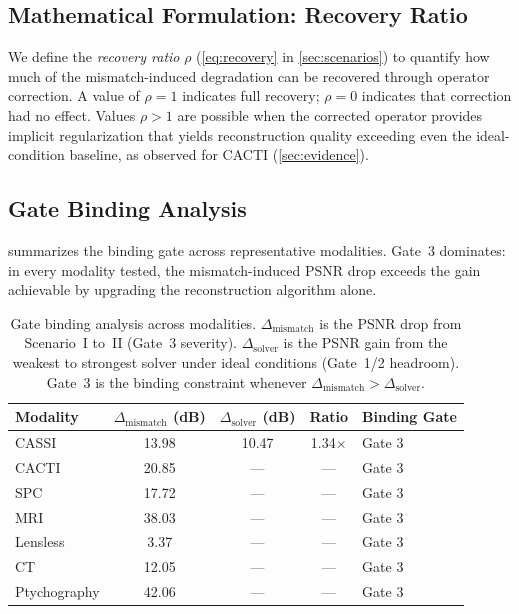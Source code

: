 \subsection{Mathematical Formulation: Recovery Ratio}

We define the \emph{recovery ratio} $\rho$ (\cref{eq:recovery} in \cref{sec:scenarios}) to quantify how much of the mismatch-induced degradation can be recovered through operator correction.  A value of $\rho = 1$ indicates full recovery; $\rho = 0$ indicates that correction had no effect.  Values $\rho > 1$ are possible when the corrected operator provides implicit regularization that yields reconstruction quality exceeding even the ideal-condition baseline, as observed for CACTI (\cref{sec:evidence}).

\subsection{Gate Binding Analysis}

 summarizes the binding gate across
representative modalities.  Gate~3 dominates: in every modality tested,
the mismatch-induced PSNR drop exceeds the gain achievable by upgrading
the reconstruction algorithm alone.

\begin{table}[t]
\centering
\caption{Gate binding analysis across modalities.
$\Delta_{\text{mismatch}}$ is the PSNR drop from Scenario~I to~II
(Gate~3 severity).
$\Delta_{\text{solver}}$ is the PSNR gain from the weakest to strongest
solver under ideal conditions (Gate~1/2 headroom).  Gate~3 is the
binding constraint whenever
$\Delta_{\text{mismatch}} > \Delta_{\text{solver}}$.}
\label{tab:gate_binding}
\smallskip
\begin{tabular}{@{}lcccl@{}}
\toprule
\textbf{Modality}  & $\Delta_{\text{mismatch}}$ (dB)
                    & $\Delta_{\text{solver}}$ (dB)
                    & \textbf{Ratio}
                    & \textbf{Binding Gate} \\
\midrule
CASSI               & 13.98 & 10.47 & 1.34$\times$ & Gate 3 \\
CACTI               & 20.85 & ---   & ---           & Gate 3 \\
SPC                  & 17.72 & ---   & ---           & Gate 3 \\
MRI                  & 38.03 & ---   & ---           & Gate 3 \\
Lensless             &  3.37 & ---   & ---           & Gate 3 \\
CT                   & 12.05 & ---   & ---           & Gate 3 \\
Ptychography         & 42.06 & ---   & ---           & Gate 3 \\
\bottomrule
\end{tabular}
\end{table}

